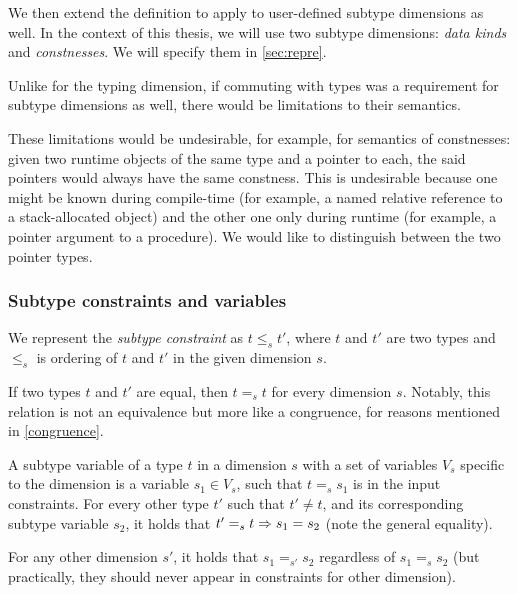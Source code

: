 We then extend the definition to apply to user-defined subtype dimensions as well. In the context of this thesis, we will use two subtype dimensions: \emph{data kinds} and \emph{constnesses}. We will specify them in \cref{sec:repre}.

\begin{remark}
    \label{congruence}
    Unlike for the typing dimension, if commuting with types was a requirement for subtype dimensions as well, there would be limitations to their semantics.

    These limitations would be undesirable, for example, for semantics of constnesses: given two runtime objects of the same type and a pointer to each, the said pointers would always have the same constness. This is undesirable because one might be known during compile-time (for example, a named relative reference to a stack-allocated object) and the other one only during runtime (for example, a pointer argument to a procedure). We would like to distinguish between the two pointer types.
\end{remark}


\subsubsection{Subtype constraints and variables}

We represent the \emph{subtype constraint} as $t \leq_s t'$, where $t$ and $t'$ are two types and $\leq_s$ is ordering of $t$ and $t'$ in the given dimension $s$.

If two types $t$ and $t'$ are equal, then $t =_s t$ for every dimension $s$. Notably, this relation is not an equivalence but more like a congruence, for reasons mentioned in \cref{congruence}.

\begin{defn}
    A subtype variable of a type $t$ in a dimension $s$ with a set of variables $V_s$ specific to the dimension is a variable $s_1 \in V_s$, such that $t =_s s_1$ is in the input constraints. For every other type $t'$ such that $t' \neq t$, and its corresponding subtype variable $s_2$, it holds that $t' =_s t \Rightarrow s_1 = s_2$ (note the general equality).
\end{defn}

For any other dimension $s'$, it holds that $s_1 =_{s'} s_2$ regardless of $s_1 =_s s_2$ (but practically, they should never appear in constraints for other dimension).

